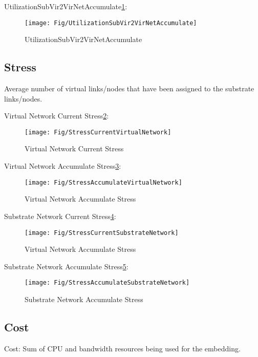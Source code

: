 UtilizationSubVir2VirNetAccumulate\ref{fig:UtilizationSubVir2VirNetAccumulate}:
\begin{figure}
  \centering
  \texttt{[image: Fig/UtilizationSubVir2VirNetAccumulate]}\\
  \caption{UtilizationSubVir2VirNetAccumulate}\label{fig:UtilizationSubVir2VirNetAccumulate}
\end{figure}


\subsection{Stress}
Average number of virtual links/nodes that have been assigned to the substrate links/nodes.

Virtual Network Current Stress\ref{fig:StressCurrentVirtualNetwork}:
\begin{figure}
  \centering
  \texttt{[image: Fig/StressCurrentVirtualNetwork]}\\
  \caption{Virtual Network Current Stress}\label{fig:StressCurrentVirtualNetwork}
\end{figure}
Virtual Network Accumulate Stress\ref{fig:StressAccumulateVirtualNetwork}:
\begin{figure}
  \centering
  \texttt{[image: Fig/StressAccumulateVirtualNetwork]}\\
  \caption{Virtual Network Accumulate Stress}\label{fig:StressAccumulateVirtualNetwork}
\end{figure}
Substrate Network Current Stress\ref{fig:StressCurrentSubstrateNetwork}:
\begin{figure}
  \centering
  \texttt{[image: Fig/StressCurrentSubstrateNetwork]}\\
  \caption{Virtual Network Accumulate Stress}\label{fig:StressCurrentSubstrateNetwork}
\end{figure}
Substrate Network Accumulate Stress\ref{fig:StressAccumulateSubstrateNetwork}:
\begin{figure}
  \centering
  \texttt{[image: Fig/StressAccumulateSubstrateNetwork]}\\
  \caption{Substrate Network Accumulate Stress}\label{fig:StressAccumulateSubstrateNetwork}
\end{figure}




\subsection{Cost}
Cost: Sum of CPU and bandwidth resources being used for the embedding.

